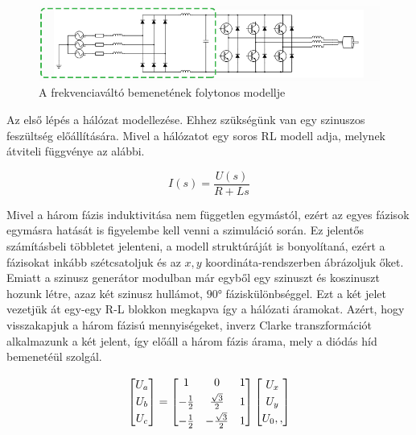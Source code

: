 \begin{figure}[H!]
	\centering
	\includegraphics[width = \textwidth]{figures/VFDschematic_choke_marked.png}
	\caption{A frekvenciaváltó bemenetének folytonos modellje} 
	\label{fig:input_marked}
\end{figure}

Az első lépés a hálózat modellezése. Ehhez szükségünk van egy szinuszos feszültség előállítására. Mivel a hálózatot egy soros RL modell adja, melynek átviteli függvénye az alábbi.


\begin{equation}
I(s) = \frac{U(s)}{R+Ls}
\end{equation}

Mivel a három fázis induktivitása nem független egymástól, ezért az egyes fázisok egymásra hatását is figyelembe kell venni a szimuláció során. Ez jelentős számításbeli többletet jelenteni, a modell struktúráját is bonyolítaná, ezért a fázisokat inkább szétcsatoljuk és az $x,y$ koordináta-rendszerben ábrázoljuk őket. Emiatt a szinusz generátor modulban már egyből egy szinuszt és koszinuszt hozunk létre, azaz két szinusz hullámot, $90°$ fáziskülönbséggel. Ezt a két jelet vezetjük át egy-egy R-L blokkon megkapva így a hálózati áramokat. Azért, hogy visszakapjuk a három fázisú mennyiségeket, inverz Clarke transzformációt alkalmazunk a két jelent, így előáll a három fázis árama, mely a diódás híd bemenetéül szolgál.

\begin{equation}
\centering
\begin{bmatrix}
       U_a\\[0.3em]
       U_b\\[0.3em]
       U_c          
\end{bmatrix}
=
\begin{bmatrix}
       1 & 0 & 1  \\[0.3em]
       -\frac{1}{2} & \frac{\sqrt{3}}{2} & 1  \\[0.3em]
       -\frac{1}{2} & -\frac{\sqrt{3}}{2} & 1 
\end{bmatrix}
\begin{bmatrix}
       U_x\\[0.3em]
       U_y\\[0.3em]
       U_0,,        
\end{bmatrix}    
\end{equation}

